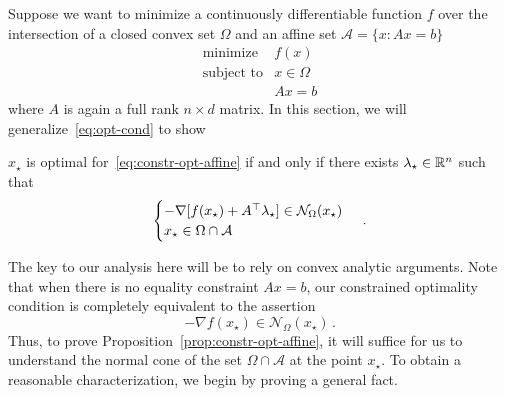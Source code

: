 \documentclass[12pt]{article}
\begin{document}


Suppose we want to minimize a continuously differentiable function $f$ over the intersection of a closed convex set $\Omega$ and an affine set $\mathcal{A} = \{x: Ax=b\}$\begin{equation} \label{eq:constr-opt-affine}
  \begin{array}{ll}
  \text{minimize} &f(x)\\
  \text{subject to} &x \in \Omega\\
  & Ax=b
  \end{array}
  \end{equation}
where $A$ is again a full rank $n\times d$ matrix.  In this section, we will generalize~\eqref{eq:opt-cond} to show

\begin{proposition}\label{prop:constr-opt-affine} $x_\star$ is optimal for~\eqref{eq:constr-opt-affine} if and only if there exists $\lambda_\star \in \mathbb{R}^n$ such that
\[
 \begin{cases}
 - \nabla [f(x_\star) + A^{\top} \lambda_\star] \in \mathcal{N}_{\Omega} (x_\star)\\
  x_\star \in \Omega \cap \mathcal{A}
  \end{cases}\,.
 \]
\end{proposition}
The key to our analysis here will be to rely on convex analytic arguments. Note that when there is no equality constraint $Ax = b$, our constrained optimality condition is completely equivalent to the assertion
\begin{equation}\label{eq:opt-cond-basic}
  - \nabla f(x_\star) \in \mathcal{N}_{\Omega}(x_\star)\,.
 \end{equation}
Thus, to prove Proposition~\ref{prop:constr-opt-affine}, it will suffice for us to understand the normal cone of the set $\Omega \cap \mathcal{A}$
at the point $x_\star$. To obtain a reasonable characterization, we begin by proving a general fact.
 
\end{document}
